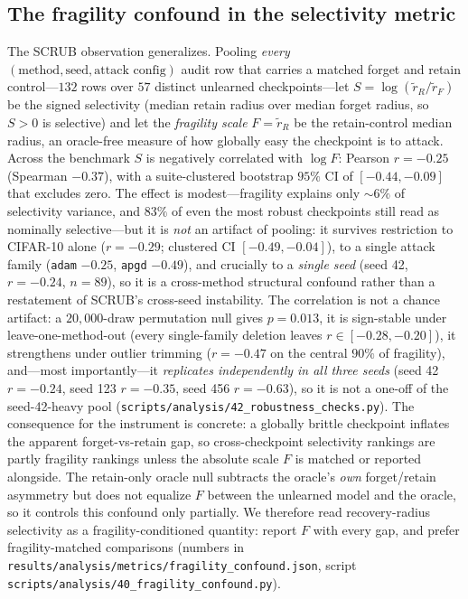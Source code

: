 \documentclass{article}
\begin{document}
\subsection{The fragility confound in the selectivity metric}
\label{sec:confound}
The SCRUB observation generalizes. Pooling \emph{every} $(\text{method},\text{seed},\text{attack config})$ audit row that carries a matched forget and retain control---$132$ rows over $57$ distinct unlearned checkpoints---let $S = \log(\tilde r_R / \tilde r_F)$ be the signed selectivity (median retain radius over median forget radius, so $S>0$ is selective) and let the \emph{fragility scale} $F = \tilde r_R$ be the retain-control median radius, an oracle-free measure of how globally easy the checkpoint is to attack. Across the benchmark $S$ is negatively correlated with $\log F$: Pearson $r = -0.25$ (Spearman $-0.37$), with a suite-clustered bootstrap $95\%$ CI of $[-0.44,-0.09]$ that excludes zero. The effect is modest---fragility explains only $\sim\!6\%$ of selectivity variance, and $83\%$ of even the most robust checkpoints still read as nominally selective---but it is \emph{not} an artifact of pooling: it survives restriction to CIFAR-10 alone ($r=-0.29$; clustered CI $[-0.49,-0.04]$), to a single attack family (\texttt{adam} $-0.25$, \texttt{apgd} $-0.49$), and crucially to a \emph{single seed} (seed 42, $r=-0.24$, $n=89$), so it is a cross-method structural confound rather than a restatement of SCRUB's cross-seed instability. The correlation is not a chance artifact: a $20{,}000$-draw permutation null gives $p = 0.013$, it is sign-stable under leave-one-method-out (every single-family deletion leaves $r \in [-0.28,-0.20]$), it strengthens under outlier trimming ($r=-0.47$ on the central $90\%$ of fragility), and---most importantly---it \emph{replicates independently in all three seeds} (seed 42 $r=-0.24$, seed 123 $r=-0.35$, seed 456 $r=-0.63$), so it is not a one-off of the seed-42-heavy pool (\texttt{scripts/analysis/42\_robustness\_checks.py}). The consequence for the instrument is concrete: a globally brittle checkpoint inflates the apparent forget-vs-retain gap, so cross-checkpoint selectivity rankings are partly fragility rankings unless the absolute scale $F$ is matched or reported alongside. The retain-only oracle null subtracts the oracle's \emph{own} forget/retain asymmetry but does not equalize $F$ between the unlearned model and the oracle, so it controls this confound only partially. We therefore read recovery-radius selectivity as a fragility-conditioned quantity: report $F$ with every gap, and prefer fragility-matched comparisons (numbers in \texttt{results/analysis/metrics/fragility\_confound.json}, script \texttt{scripts/analysis/40\_fragility\_confound.py}).
\end{document}
